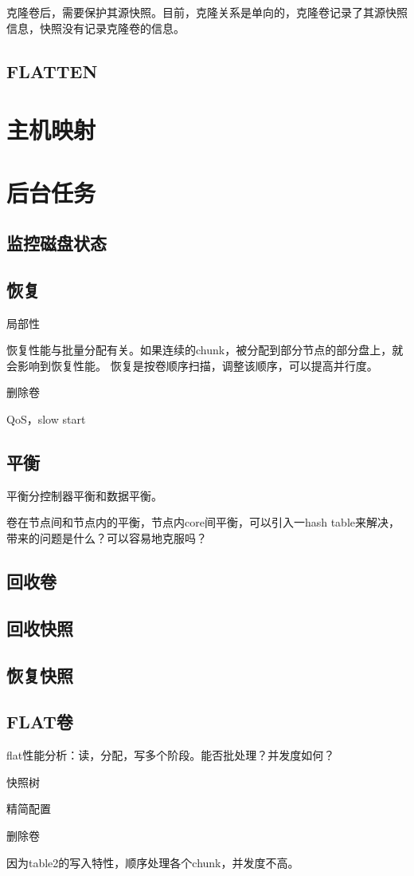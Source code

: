 克隆卷后，需要保护其源快照。目前，克隆关系是单向的，克隆卷记录了其源快照信息，快照没有记录克隆卷的信息。

\subsection{FLATTEN}

\section{主机映射}

\section{后台任务}

\subsection{监控磁盘状态}

\subsection{恢复}

局部性

恢复性能与批量分配有关。如果连续的chunk，被分配到部分节点的部分盘上，就会影响到恢复性能。
恢复是按卷顺序扫描，调整该顺序，可以提高并行度。

删除卷

QoS，slow start

\subsection{平衡}

平衡分控制器平衡和数据平衡。

卷在节点间和节点内的平衡，节点内core间平衡，可以引入一hash table来解决，
带来的问题是什么？可以容易地克服吗？

\subsection{回收卷}

\subsection{回收快照}

\subsection{恢复快照}

\subsection{FLAT卷}

flat性能分析：读，分配，写多个阶段。能否批处理？并发度如何？

快照树

精简配置

删除卷

因为table2的写入特性，顺序处理各个chunk，并发度不高。
